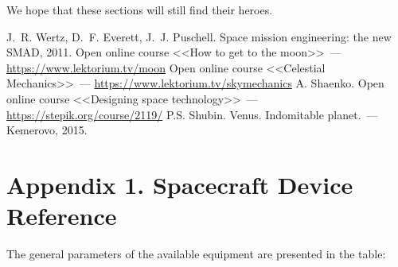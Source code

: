 \documentclass[12pt,a4paper]{article}
\begin{document}
We hope that these sections will still find their heroes.

\begin{thebibliography}{3}
 J.~R. Wertz, D.~F. Everett, J.~J. Puschell. Space mission
  engineering: the new SMAD, 2011.
 Open online course <<How to get to the moon>>~---
  \url{https://www.lektorium.tv/moon}
 Open online course <<Celestial Mechanics>>~---
  \url{https://www.lektorium.tv/skymechanics}
 A. Shaenko. Open online course <<Designing space technology>>~---
  \url{https://stepik.org/course/2119/}
 P.S. Shubin. Venus. Indomitable planet.~--- Kemerovo, 2015.
\end{thebibliography}

\section*{Appendix 1. Spacecraft Device Reference}
\label{Sec:Devices}

The general parameters of the available equipment are presented in the table:
\end{document}
